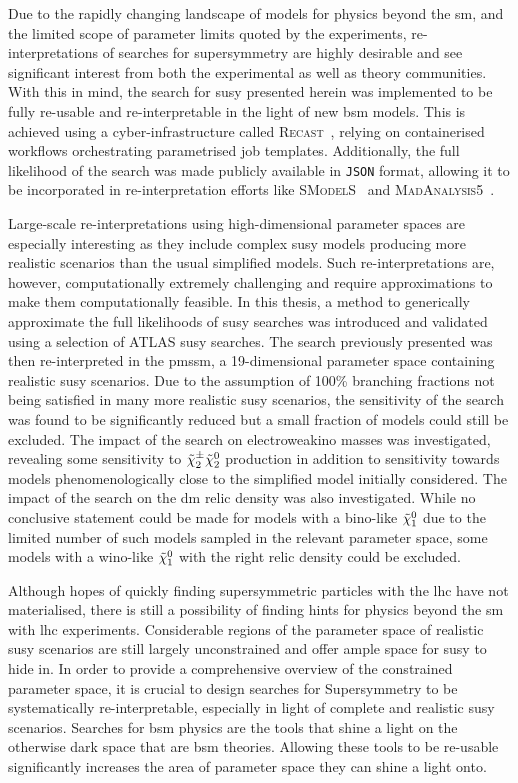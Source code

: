 Due to the rapidly changing landscape of models for physics beyond the \gls{sm}, and the limited scope of parameter limits quoted by the experiments, re-interpretations of searches for supersymmetry are highly desirable and see significant interest from both the experimental as well as theory communities. With this in mind, the search for \gls{susy} presented herein was implemented to be fully re-usable and re-interpretable in the light of new \gls{bsm} models. This is achieved using a cyber-infrastructure called \textsc{Recast}~\cite{RECAST_cranmer}, relying on containerised workflows orchestrating parametrised job templates. Additionally, the full likelihood of the search was made publicly available in \texttt{JSON} format, allowing it to be incorporated in re-interpretation efforts like \textsc{SModelS}~\cite{SModelS1:2013mwa,SModelS2:2017neo} and \textsc{MadAnalysis5}~\cite{Goodsell:2020ddr,Fuks:2021wpe}. 
 
Large-scale re-interpretations using high-dimensional parameter spaces are especially interesting as they include complex \gls{susy} models producing more realistic scenarios than the usual simplified models. Such re-interpretations are, however, computationally extremely challenging and require approximations to make them computationally feasible. In this thesis, a method to generically approximate the full likelihoods of \gls{susy} searches was introduced and validated using a selection of ATLAS \gls{susy} searches. The search previously presented was then re-interpreted in the \gls{pmssm}, a 19-dimensional parameter space containing realistic \gls{susy} scenarios. Due to the assumption of 100\% branching fractions not being satisfied in many more realistic \gls{susy} scenarios, the sensitivity of the \onelepton search was found to be significantly reduced but a small fraction of models could still be excluded. The impact of the \onelepton search on electroweakino masses was investigated, revealing some sensitivity to $\tilde{\chi}_2^\pm\tilde{\chi}_2^0$ production in addition to sensitivity towards models phenomenologically close to the simplified model initially considered. The impact of the \onelepton search on the \gls{dm} relic density was also investigated. While no conclusive statement could be made for models with a bino-like $\tilde{\chi}_1^0$ due to the limited number of such models sampled in the relevant parameter space, some models with a wino-like $\tilde{\chi}_1^0$ with the right relic density could be excluded. 
 
 Although hopes of quickly finding supersymmetric particles with the \gls{lhc} have not materialised, there is still a possibility of finding hints for physics beyond the \gls{sm} with \gls{lhc} experiments. Considerable regions of the parameter space of realistic \gls{susy} scenarios are still largely unconstrained and offer ample space for \gls{susy} to hide in. In order to provide a comprehensive overview of the constrained parameter space, it is crucial to design searches for Supersymmetry to be systematically re-interpretable, especially in light of complete and realistic \gls{susy} scenarios. Searches for \gls{bsm} physics are the tools that shine a light on the otherwise dark space that are \gls{bsm} theories. Allowing these tools to be re-usable significantly increases the area of parameter space they can shine a light onto.    
 